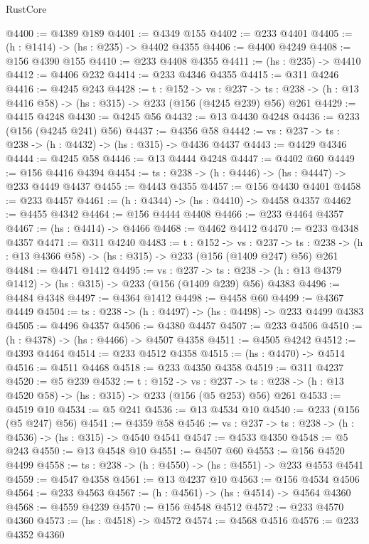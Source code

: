 \begin{lexlean}{RustCore}
\begin{coremodule}
@4400 := @4389 @189
@4401 := @4349 @155
@4402 := @233 @4401
@4405 := (h : @1414) -> (hs : @235) -> @4402 @4355
@4406 := @4400 @4249
@4408 := @156 @4390 @155
@4410 := @233 @4408 @4355
@4411 := (hs : @235) -> @4410
@4412 := @4406 @232
@4414 := @233 @4346 @4355
@4415 := @311 @4246
@4416 := @4245 @243
@4428 := {t : @152} ->
  {vs : @237} ->
  {ts : @238} -> (h : @13 @4416 @58) -> (hs : @315) -> @233 (@156 (@4245 @239) @56) @261
@4429 := @4415 @4248
@4430 := @4245 @56
@4432 := @13 @4430 @4248
@4436 := @233 (@156 (@4245 @241) @56)
@4437 := @4356 @58
@4442 := {vs : @237} -> {ts : @238} -> (h : @4432) -> (hs : @315) -> @4436 @4437
@4443 := @4429 @4346
@4444 := @4245 @58
@4446 := @13 @4444 @4248
@4447 := @4402 @60
@4449 := @156 @4416 @4394
@4454 := {ts : @238} -> (h : @4446) -> (hs : @4447) -> @233 @4449 @4437
@4455 := @4443 @4355
@4457 := @156 @4430 @4401
@4458 := @233 @4457
@4461 := (h : @4344) -> (hs : @4410) -> @4458 @4357
@4462 := @4455 @4342
@4464 := @156 @4444 @4408
@4466 := @233 @4464 @4357
@4467 := (hs : @4414) -> @4466
@4468 := @4462 @4412
@4470 := @233 @4348 @4357
@4471 := @311 @4240
@4483 := {t : @152} ->
  {vs : @237} ->
  {ts : @238} -> (h : @13 @4366 @58) -> (hs : @315) -> @233 (@156 (@1409 @247) @56) @261
@4484 := @4471 @1412
@4495 := {vs : @237} ->
  {ts : @238} -> (h : @13 @4379 @1412) -> (hs : @315) -> @233 (@156 (@1409 @239) @56) @4383
@4496 := @4484 @4348
@4497 := @4364 @1412
@4498 := @4458 @60
@4499 := @4367 @4449
@4504 := {ts : @238} -> (h : @4497) -> (hs : @4498) -> @233 @4499 @4383
@4505 := @4496 @4357
@4506 := @4380 @4457
@4507 := @233 @4506
@4510 := (h : @4378) -> (hs : @4466) -> @4507 @4358
@4511 := @4505 @4242
@4512 := @4393 @4464
@4514 := @233 @4512 @4358
@4515 := (hs : @4470) -> @4514
@4516 := @4511 @4468
@4518 := @233 @4350 @4358
@4519 := @311 @4237
@4520 := @5 @239
@4532 := {t : @152} ->
  {vs : @237} -> {ts : @238} -> (h : @13 @4520 @58) -> (hs : @315) -> @233 (@156 (@5 @253) @56) @261
@4533 := @4519 @10
@4534 := @5 @241
@4536 := @13 @4534 @10
@4540 := @233 (@156 (@5 @247) @56)
@4541 := @4359 @58
@4546 := {vs : @237} -> {ts : @238} -> (h : @4536) -> (hs : @315) -> @4540 @4541
@4547 := @4533 @4350
@4548 := @5 @243
@4550 := @13 @4548 @10
@4551 := @4507 @60
@4553 := @156 @4520 @4499
@4558 := {ts : @238} -> (h : @4550) -> (hs : @4551) -> @233 @4553 @4541
@4559 := @4547 @4358
@4561 := @13 @4237 @10
@4563 := @156 @4534 @4506
@4564 := @233 @4563
@4567 := (h : @4561) -> (hs : @4514) -> @4564 @4360
@4568 := @4559 @4239
@4570 := @156 @4548 @4512
@4572 := @233 @4570 @4360
@4573 := (hs : @4518) -> @4572
@4574 := @4568 @4516
@4576 := @233 @4352 @4360

\end{coremodule}
\end{lexlean}
